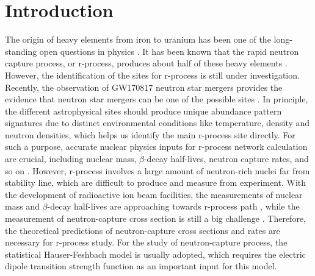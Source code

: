 \documentclass[prc,twocolumn,twoside,showpacs,superscriptaddress,floatfix]{revtex4-1}
\begin{document}
\section{Introduction}\label{intro}

The origin of heavy elements from iron to uranium has been one of the
long-standing open questions in physics \cite{discover}. It has been known that
the rapid neutron capture process, or r-process, produces about half of these
heavy elements \cite{Placeholder:01}. However, the identification of the sites
for r-process is still under investigation. Recently, the observation of
GW170817 neutron star mergers provides the evidence that neutron star mergers
can be one of the possible sites \cite{Placeholder:02}. In principle, the
different astrophysical sites should produce unique abundance pattern
signatures due to distinct environmental conditions like temperature, density
and neutron densities, which helps us identify the main r-process site
directly\cite{Placeholder:03}.  For such a purpose, accurate nuclear physics
inputs for r-process network calculation are crucial, including nuclear mass,
$\beta$-decay half-lives, neutron capture rates, and so on
\cite{Placeholder:04}. However, r-process involves a large amount of
neutron-rich nuclei far from stability line, which are difficult to produce and
measure from experiment. With the development of radioactive ion beam
facilities, the measurements of nuclear mass and $\beta$-decay half-lives are
approaching towards r-process path \cite{Placeholder:05}, while the measurement
of neutron-capture cross section is still a big challenge
\cite{Placeholder:06}. Therefore, the theoretical predictions of
neutron-capture cross sections and rates are necessary for r-process study. For
the study of neutron-capture process, the statistical Hauser-Feshbach
\cite{Placeholder:07} model is usually adopted, which requires the electric
dipole transition strength function as an important input for this model.
\end{document}
